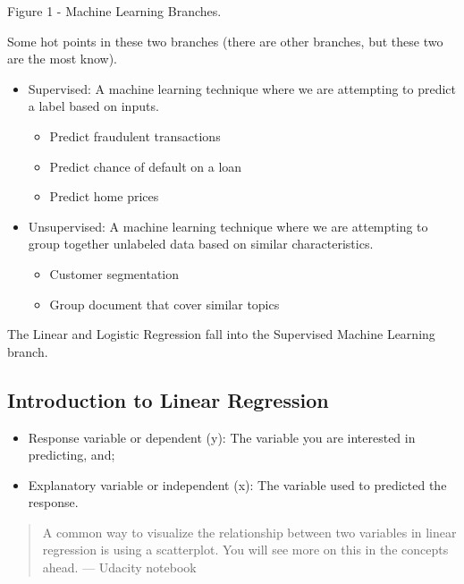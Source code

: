 \documentclass[]{book}
\providecommand{\tightlist}{%
  \setlength{\itemsep}{0pt}\setlength{\parskip}{0pt}}
\begin{document}
Figure 1 - Machine Learning Branches.

Some hot points in these two branches (there are other branches, but
these two are the most know).

\begin{itemize}
\tightlist
\item
  Supervised: A machine learning technique where we are attempting to
  predict a label based on inputs.

  \begin{itemize}
  \tightlist
  \item
    Predict fraudulent transactions
  \item
    Predict chance of default on a loan
  \item
    Predict home prices
  \end{itemize}
\item
  Unsupervised: A machine learning technique where we are attempting to
  group together unlabeled data based on similar characteristics.

  \begin{itemize}
  \tightlist
  \item
    Customer segmentation
  \item
    Group document that cover similar topics
  \end{itemize}
\end{itemize}

The Linear and Logistic Regression fall into the Supervised Machine
Learning branch.

\subsection{Introduction to Linear
Regression}\label{introduction-to-linear-regression}

\begin{itemize}
\tightlist
\item
  Response variable or dependent (y): The variable you are interested in
  predicting, and;
\item
  Explanatory variable or independent (x): The variable used to
  predicted the response.
\end{itemize}

\begin{quote}
A common way to visualize the relationship between two variables in
linear regression is using a scatterplot. You will see more on this in
the concepts ahead. --- Udacity notebook
\end{quote}
\end{document}
